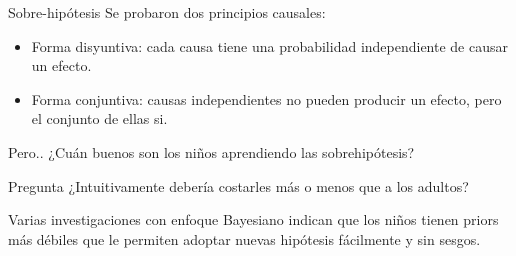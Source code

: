 \begin{frame}[fragile]
\begin{block}{Sobre-hipótesis}
Se probaron dos principios causales:
\begin{itemize}
\item Forma disyuntiva: cada causa tiene una probabilidad independiente de causar un efecto.
\item Forma conjuntiva: causas independientes no pueden producir un efecto, pero el conjunto de ellas si.
\end{itemize}
\end{block}

\pause
Pero.. ¿Cuán buenos son los niños aprendiendo las sobrehipótesis?

\begin{exampleblock}{Pregunta}
¿Intuitivamente debería costarles más o menos que a los adultos? 
\end{exampleblock}

\pause
Varias investigaciones con enfoque Bayesiano indican que los niños tienen priors más débiles que le permiten adoptar nuevas hipótesis fácilmente y sin sesgos.


\end{frame}